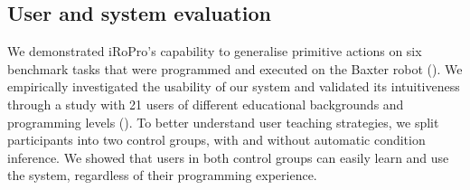 \subsection{User and system evaluation}
We demonstrated iRoPro's capability to generalise primitive actions on six benchmark tasks that were programmed and executed on the Baxter robot ().
We empirically investigated the usability of our system and validated its intuitiveness through a study with 21 users of different educational backgrounds and programming levels
().
To better understand user teaching strategies, we split participants into two control groups, with and without automatic condition inference.
We showed that users in both control groups can easily learn and use the system, regardless of their programming experience.





